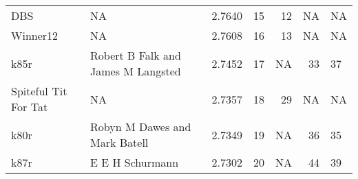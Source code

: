 \begin{tabular}{llrrrrl}
DBS                        &                                  NA &  2.7640 &    15 &            12 &             NA &              NA \\
Winner12                   &                                  NA &  2.7608 &    16 &            13 &             NA &              NA \\
k85r                       &  Robert B Falk and James M Langsted &  2.7452 &    17 &            NA &             33 &              37 \\
Spiteful Tit For Tat       &                                  NA &  2.7357 &    18 &            29 &             NA &              NA \\
k80r                       &       Robyn M Dawes and Mark Batell &  2.7349 &    19 &            NA &             36 &              35 \\
k87r                       &                     E E H Schurmann &  2.7302 &    20 &            NA &             44 &              39 \\
\bottomrule
\end{tabular}
